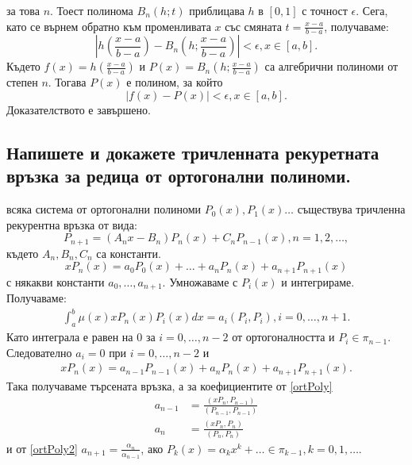 \documentclass[12pt]{article}
\numberwithin{equation}{subsection}
\numberwithin{theorem}{subsection}
\numberwithin{definition}{subsection}
\numberwithin{corollary}{subsection}
\begin{document}
  за това $n$. Тоест полинома $B_n(h;t)$ приблицава $h$ в $[0,1]$ с точност $\epsilon$. Сега, като се върнем обратно към променливата $x $ със смяната $t=\frac{x-a}{b-a}$, получаваме:
  \begin{equation*}
    \left|
    h\left(\frac{x-a}{b-a}\right) - B_n\left(h;\frac{x-a}{b-a}\right)
    \right|<\epsilon, x\in[a,b].
  \end{equation*}
  Където $f(x)=h\left(\frac{x-a}{b-a}\right)$ и $P(x)=B_n\left(h;\frac{x-a}{b-a}\right)$ са алгебрични полиноми от степен $n$. Тогава $P(x)$ е полином, за който
  \begin{equation*}
    |f(x)-P(x)|<\epsilon, x\in[a,b].
  \end{equation*}
  Доказателството е завършено.
\subsection{Напишете и докажете тричленната рекуретната връзка за редица от ортогонални полиноми.}
   всяка система от ортогонални полиноми $P_0(x), P_1(x)\ldots$ съществува тричленна рекурентна връзка от вида:
  \begin{equation}\label{recOrtPoly}
    P_{n+1}=(A_nx-B_n)P_n(x)+C_nP_{n-1}(x), n=1,2,\ldots,
  \end{equation}
  където $A_n, B_n, C_n$ са константи.
  \proof
  \begin{equation*}
    xP_n(x)=a_0P_0(x)+\ldots+a_nP_n(x)+a_{n+1}P_{n+1}(x)
  \end{equation*}
  с някакви константи $a_0, \ldots, a_{n+1}$. Умножаваме с $P_i(x)$ и интегрираме. Получаваме:
  \begin{align}\label{ortPoly}
    \int_{a}^{b}\mu(x)xP_n(x)P_i(x)dx = a_i(P_i,P_i), i=0,\ldots, n+1.
  \end{align}
  Като интеграла е равен на $0$ за $i=0,\ldots, n-2$ от ортогоналността и $P_{i}\in\pi_{n-1}$. Следователно $a_i=0$ при $i=0,\ldots,n-2$ и
  \begin{align}\label{ortPoly2}
    xP_n(x)=a_{n-1}P_{n-1}(x)+a_nP_n(x)+a_{n+1}P_{n+1}(x).
  \end{align}
  Така получаваме търсената връзка, а за коефициентите от \ref{ortPoly}
  \begin{align*}
    a_{n-1}&=\frac{(xP_n,P_{n-1})}{(P_{n-1},P_{n-1})}\\
    a_n    &=\frac{(xP_n,P_n)}{(P_n, P_n)}
  \end{align*}
  и от \ref{ortPoly2} $a_{n+1}=\frac{\alpha_n}{\alpha_{n-1}}$, ако $P_k(x)=\alpha_kx^k+\ldots\in\pi_{k-1}, k=0,1,\ldots$.
\end{document}
